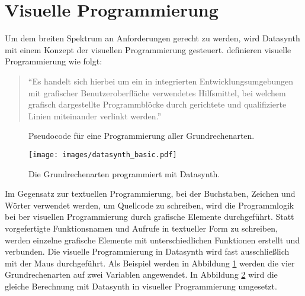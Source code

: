 \documentclass[a4paper, 12pt, DIVcalc, onepage, pdftex, headsepline, footsepline]{scrreprt}
\begin{document}
\section{Visuelle Programmierung}
\label{sec:visPro}
Um dem breiten Spektrum an Anforderungen gerecht zu werden,
wird Datasynth mit einem Konzept der visuellen Programmierung gesteuert.
\citep[S.\,XXX]{Henning} definieren visuelle Programmierung wie folgt:
\begin{quote}
"`Es handelt sich hierbei um ein in integrierten Entwicklungsumgebungen mit
grafischer Benutzeroberfläche verwendetes Hilfsmittel, bei welchem grafisch
dargestellte Programmblöcke durch gerichtete und qualifizierte Linien miteinander
verlinkt werden."'
\end{quote}
\begin{figure}
\centering

\caption{Pseudocode für eine Programmierung aller Grundrechenarten.}
\label{fig:textuell}
\end{figure}
\begin{figure}
\centering
\texttt{[image: images/datasynth\_basic.pdf]}
\caption{Die Grundrechenarten programmiert mit Datasynth.}
\label{fig:datasynth_basic}
\end{figure}
Im Gegensatz zur textuellen Programmierung, bei der Buchstaben, Zeichen und Wörter
verwendet werden, um Quellcode zu schreiben, wird die Programmlogik bei ber
visuellen Programmierung durch grafische Elemente durchgeführt.
Statt vorgefertigte Funktionsnamen und Aufrufe in textueller Form zu schreiben, werden einzelne grafische
Elemente mit unterschiedlichen Funktionen erstellt und verbunden. Die visuelle Programmierung
in Datasynth wird fast ausschließlich mit der Maus durchgeführt.
Als Beispiel werden in Abbildung
\ref{fig:textuell} werden die vier Grundrechenarten auf zwei Variablen angewendet.
In Abbildung \ref{fig:datasynth_basic} wird die gleiche Berechnung mit Datasynth
in visueller Programmierung umgesetzt.
\end{document}
